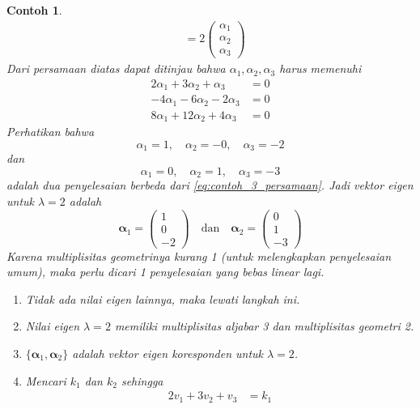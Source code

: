 \documentclass[a4paper]{article}
\theoremstyle{definisi}
\newtheorem{contoh}{Contoh}[section]
\newcommand{\bfalpha}{\boldsymbol{\alpha}}
\numberwithin{equation}{section}
\begin{document}
\begin{contoh}
\begin{align*}
      &=2\begin{pmatrix}
        \alpha_1\\\alpha_2\\\alpha_3
      \end{pmatrix}
    \end{align*}
    Dari persamaan diatas dapat ditinjau bahwa $\alpha_1,\alpha_2,\alpha_3$ harus memenuhi
    \begin{equation}\label{eq:contoh_3_persamaan}
      \begin{split}
        2\alpha_1+3\alpha_2+\alpha_3&=0\\
        -4\alpha_1-6\alpha_2-2\alpha_3&=0\\
        8\alpha_1+12\alpha_2+4\alpha_3&=0
      \end{split}
    \end{equation}
    Perhatikan bahwa 
    \[\alpha_1=1,\quad\alpha_2=-0,\quad\alpha_3=-2\]
    dan
    \[\alpha_1=0,\quad\alpha_2=1,\quad\alpha_3=-3\]
    adalah dua penyelesaian berbeda dari \eqref{eq:contoh_3_persamaan}. Jadi vektor eigen untuk $\lambda=2$ adalah
    \begin{equation*}
      \bfalpha_1=\begin{pmatrix}
        1\\0\\-2
      \end{pmatrix}\quad\text{dan}\quad
      \bfalpha_2=\begin{pmatrix}
        0\\1\\-3
      \end{pmatrix}
    \end{equation*}
    Karena multiplisitas geometrinya kurang 1 (untuk melengkapkan penyelesaian umum), maka perlu dicari 1 penyelesaian yang bebas linear lagi.
    \begin{enumerate}[label=Langkah \arabic*: ,leftmargin=*]
      \item Tidak ada nilai eigen lainnya, maka lewati langkah ini.
      \item Nilai eigen $\lambda=2$ memiliki multiplisitas aljabar 3 dan multiplisitas geometri 2.
      \item $\{\bfalpha_1,\bfalpha_2\}$ adalah vektor eigen koresponden untuk $\lambda=2$.
      \item Mencari $k_1$ dan $k_2$ sehingga
      \begin{equation}\label{eq:contoh_3_langkah_3}
        \begin{split}
          2v_1+3v_2+v_3&=k_1\\

\end{split}
\end{equation}
\end{enumerate}
\end{contoh}
\end{document}
